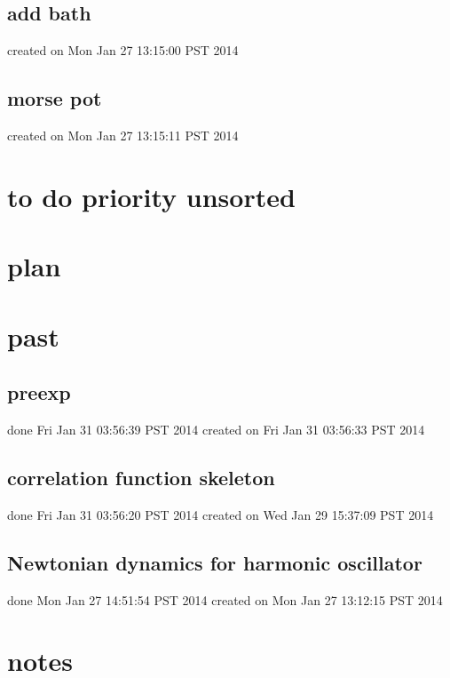 \documentclass{article}
\begin{document}
\subsection{add bath}
created on Mon Jan 27 13:15:00 PST 2014
\label{sub:add_bath}

\subsection{morse pot}
created on Mon Jan 27 13:15:11 PST 2014
\label{sub:morse_pot}

\section{to do priority unsorted}
\section{plan}
\section{past} %
\subsection{preexp}
done Fri Jan 31 03:56:39 PST 2014
created on Fri Jan 31 03:56:33 PST 2014
\label{sub:preexp}

\subsection{correlation function skeleton}
done Fri Jan 31 03:56:20 PST 2014
created on Wed Jan 29 15:37:09 PST 2014
\label{sub:correlation_function_skeleton}
\subsection{Newtonian dynamics for harmonic oscillator}
done Mon Jan 27 14:51:54 PST 2014
created on Mon Jan 27 13:12:15 PST 2014
\label{sub:newtonian_dynamics_for_harmonic_oscillator}

\section{notes}
\end{document}
